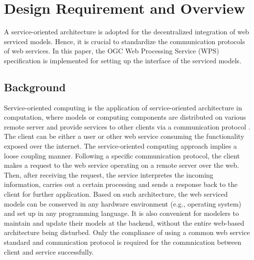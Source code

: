 \documentclass[review]{elsarticle}
\begin{document}
\section{Design Requirement and Overview} A service-oriented architecture is adopted for the decentralized integration of web serviced models. Hence, it is crucial to standardize the communication protocols of web services. In this paper, the OGC Web Processing Service (WPS) specification is implemented for setting up the interface of the serviced models.

\subsection{Background} Service-oriented computing is the application of service-oriented architecture in computation, where models or computing components are distributed on various remote server and provide services to other clients via a communication protocol \citep{huhns2005, erl2004}. The client can be either a user or other web service consuming the functionality exposed over the internet. The service-oriented computing approach implies a loose coupling manner. Following a specific communication protocol, the client makes a request to the web service operating on a remote server over the web. Then, after receiving the request, the service interpretes the incoming information, carries out a certain processing and sends a response back to the client for further application. Based on such architecture, the web serviced models can be conserved in any hardware environment (e.g., operating system) and set up in any programming language. It is also convenient for modelers to maintain and update their models at the backend, without the entire web-based architecture being disturbed. Only the compliance of using a common web service standard and commnication protocol is required for the commnication between client and service successfully.
\end{document}
